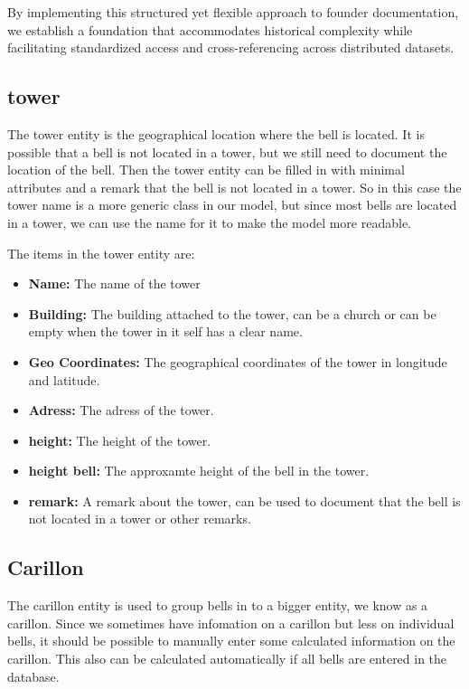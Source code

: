 \documentclass[11pt, a4paper]{article}
\begin{document}
By implementing this structured yet flexible approach to founder documentation, we establish a foundation that accommodates 
historical complexity while facilitating standardized access and cross-referencing across distributed datasets.

\subsection{tower}

The tower entity is the geographical location where the bell is located. It is possible that a bell is not located in a tower, but
we still need to document the location of the bell. Then the tower entity can be filled in with minimal attributes and a remark that
the bell is not located in a tower. So in this case the tower name is a more generic class in our model, but since most bells are located 
in a tower, we can use the name for it to make the model more readable.

The items in the tower entity are:

\begin{itemize}
    \item \textbf{Name:} The name of the tower
    \item \textbf{Building:} The building attached to the tower, can be a church or can be empty when the tower in it self has a clear name.
    \item \textbf{Geo Coordinates:} The geographical coordinates of the tower in longitude and latitude.
    \item \textbf{Adress:} The adress of the tower.
    \item \textbf{height:} The height of the tower.
    \item \textbf{height bell:} The approxamte height of the bell in the tower.
    \item \textbf{remark:} A remark about the tower, can be used to document that the bell is not located in a tower or other remarks.
\end{itemize}

\subsection{Carillon}

The carillon entity is used to group bells in to a bigger entity, we know as a carillon. Since we sometimes have infomation on  a carillon but less on individual bells,
it should be possible to manually enter some calculated information on the carillon.
This also can be calculated automatically if all bells are entered in the database. 
\end{document}
